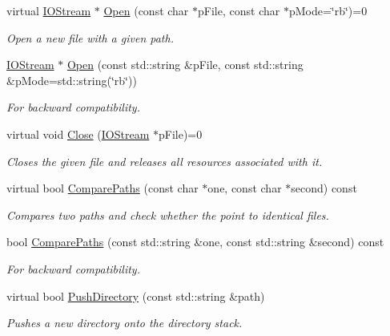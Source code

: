 \begin{CompactItemize}
virtual \hyperlink{class_assimp_1_1_i_o_stream}{IOStream} $\ast$ \hyperlink{class_assimp_1_1_i_o_system_c512ece3b0701de5682553007a4c0816}{Open} (const char $\ast$pFile, const char $\ast$pMode=\char`\"{}rb\char`\"{})=0
\begin{CompactList}\small\item\em Open a new file with a given path. \item\end{CompactList}\item 
\hyperlink{class_assimp_1_1_i_o_stream}{IOStream} $\ast$ \hyperlink{class_assimp_1_1_i_o_system_ef35fabc9bd49fb83bfd4f12a94083c3}{Open} (const std::string \&pFile, const std::string \&pMode=std::string(\char`\"{}rb\char`\"{}))
\begin{CompactList}\small\item\em For backward compatibility. \item\end{CompactList}\item 
virtual void \hyperlink{class_assimp_1_1_i_o_system_8c334d60f04bceeb6bd0157d21723f3e}{Close} (\hyperlink{class_assimp_1_1_i_o_stream}{IOStream} $\ast$pFile)=0
\begin{CompactList}\small\item\em Closes the given file and releases all resources associated with it. \item\end{CompactList}\item 
virtual bool \hyperlink{class_assimp_1_1_i_o_system_11349a65b353ed62f655c3dd802b9062}{ComparePaths} (const char $\ast$one, const char $\ast$second) const 
\begin{CompactList}\small\item\em Compares two paths and check whether the point to identical files. \item\end{CompactList}\item 
bool \hyperlink{class_assimp_1_1_i_o_system_39a29f6ee6b76deaa59aed2b7494b182}{ComparePaths} (const std::string \&one, const std::string \&second) const 
\begin{CompactList}\small\item\em For backward compatibility. \item\end{CompactList}\item 
virtual bool \hyperlink{class_assimp_1_1_i_o_system_07c2c93fac300df44c756174fcea71e8}{PushDirectory} (const std::string \&path)
\begin{CompactList}\small\item\em Pushes a new directory onto the directory stack. \item\end{CompactList}\item 

\end{CompactItemize}
